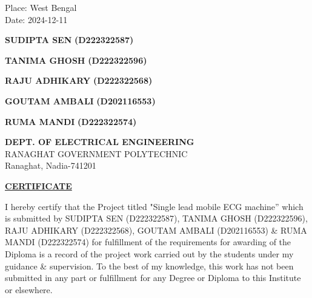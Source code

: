 \documentclass[12pt,a4paper]{report}
\begin{document}
\noindent \begin{minipage}{3.6cm}
\begin{flushleft}
\vspace{5 cm}
                         
Place: West Bengal\\
Date: 2024-12-11\\

\end{flushleft} 
\end{minipage}
\hfill
\begin{minipage}{13.6cm}
\begin{flushright}                                      
\vspace{5 cm}
\begin{multicols}{3}
\textbf{SUDIPTA SEN}
\textbf{(D222322587)}\\
\vspace{0.2cm}

\textbf{TANIMA GHOSH}
\textbf{(D222322596)}\\
\vspace{0.2cm}

\textbf{RAJU ADHIKARY}
\textbf{(D222322568)}\\
\vspace{0.2cm}

\textbf{GOUTAM AMBALI}
\textbf{(D202116553)}\\
\vspace{0.2cm}

\textbf{RUMA MANDI}
\textbf{(D222322574)}\\
\vspace{0.2cm}
\end{multicols}


\end{flushright} 
\end{minipage}

\thispagestyle{empty}

\newpage


\begin{center}
\textbf{DEPT. OF ELECTRICAL ENGINEERING}\\

RANAGHAT GOVERNMENT POLYTECHNIC \\

Ranaghat, Nadia-741201\\
\end{center}

\vspace{2cm}
\begin{center}
 \textbf{\underline {CERTIFICATE}}
\end{center}
\sloppy I hereby certify that the Project titled "Single lead mobile ECG machine” which is submitted by SUDIPTA SEN (D222322587), TANIMA GHOSH (D222322596), RAJU ADHIKARY (D222322568), GOUTAM AMBALI (D202116553) \& RUMA MANDI (D222322574) for fulfillment of the requirements for awarding of the Diploma is a record of the project work carried out by the students under my guidance \& supervision. To the best of my knowledge, this work has not been submitted in any part or fulfillment for any Degree or Diploma to this Institute or elsewhere.
\end{document}
